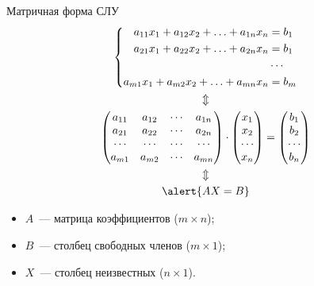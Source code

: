 \documentclass[unicode,11pt,notheorems]{beamer}
\begin{document}
\begin{frame}{Матричная форма СЛУ}{}
\vspace{-5mm}
	\begin{gather*}
	\left\lbrace \begin{aligned}
		a_{11}x_1+ a_{12}x_2+ \ldots+ a_{1n}x_n &= b_1\\
		a_{21}x_1+ a_{22}x_2+ \ldots+ a_{2n}x_n &= b_1\\
		&\cdots\\
		a_{m1}x_1+ a_{m2}x_2+ \ldots+ a_{mn}x_n &= b_m\\
	\end{aligned}
	\right.\\
\Updownarrow\\
		\begin{pmatrix} 
			a_{11} & a_{12} & \cdots & a_{1n}\\
			a_{21} & a_{22} & \cdots & a_{2n}\\
			\cdots &\cdots &\cdots &\cdots \\
			a_{m1} & a_{m2} & \cdots & a_{mn}\\
		\end{pmatrix}
		\cdot
		\begin{pmatrix} 
			x_{1}\\
			x_{2}\\
			\cdots\\
			x_{n}\\
		\end{pmatrix}	
		=
		\begin{pmatrix} 
			b_{1}\\
			b_{2}\\
			\cdots\\
			b_{n}\\
		\end{pmatrix}\\
\Updownarrow\\
		\alert{AX=B}
\end{gather*}

\vspace{-2mm}
\begin{itemize}
	\item $A$~--- матрица коэффициентов ($m\times n$);
	\item 
		$B$~--- столбец свободных членов ($m\times 1$);
	\item 
		$X$~--- столбец неизвестных ($n\times 1$).
\end{itemize}
\end{frame}
\end{document}
